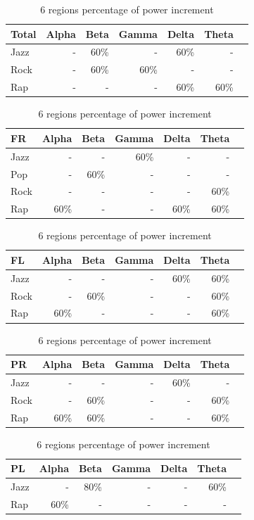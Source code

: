 \documentclass[9pt,twocolumn]{paper-template}
\begin{document}
\begin{table}[h!]%
\centering
\caption{6 regions percentage of power increment}
\label{table:6reg}
\begin{tabular}{lrrrrrr}
\textbf{Total} & Alpha & Beta & Gamma & Delta & Theta \\
\midrule
Jazz & - & 60\% & - & 60\% & - \\
Rock & - & 60\% & 60\% & - & - \\
Rap & - & - & - & 60\% & 60\% \\
\bottomrule
\end{tabular}

\begin{tabular}{lrrrrrr}
\textbf{FR} & Alpha & Beta & Gamma & Delta & Theta \\
\midrule
Jazz & - & - & 60\% & - & - \\
Pop & - & 60\% & - & - & - \\
Rock & - & - & - & - & 60\% \\
Rap & 60\% & - & - & 60\% & 60\% \\
\bottomrule
\end{tabular}

\begin{tabular}{lrrrrrr}
\textbf{FL} & Alpha & Beta & Gamma & Delta & Theta \\
\midrule
Jazz & - & - & - & 60\% & 60\% \\
Rock & - & 60\% & - & - & 60\% \\
Rap & 60\% & - & - & - & 60\% \\
\bottomrule
\end{tabular}

\begin{tabular}{lrrrrrr}
\textbf{PR} & Alpha & Beta & Gamma & Delta & Theta \\
\midrule
Jazz & - & - & - & 60\% & - \\
Rock & - & 60\% & - & - & 60\% \\
Rap & 60\% & 60\% & - & - & 60\% \\
\bottomrule
\end{tabular}

\begin{tabular}{lrrrrrr}
\textbf{PL} & Alpha & Beta & Gamma & Delta & Theta \\
\midrule
Jazz & - & 80\% & - & - & 60\% \\
Rap & 60\% & - & - & - & - \\
\bottomrule
\end{tabular}


\end{table}
\end{document}
